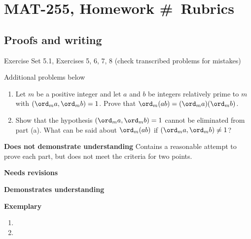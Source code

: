 \documentclass[letterpaper, 11pt]{../ximera}
\begin{document}
\chapter{MAT-255, Homework \#\homework\ Rubrics}

\section*{Proofs and writing}  %
Exercise Set 5.1, Exercises 5, 6, 7, 8 (check transcribed problems for mistakes)

\noindent Additional problems below

\begin{ex} 
	\begin{enumerate}[label=(\alph*)]
 		\item\label{order_mult} Let $m$ be a positive integer and let $a$ and $b$ be integers relatively prime to $m$ with $(\ord_m a, \ord_m b)=1$. Prove that $\ord_m(ab)=(\ord_m a)(\ord_m b)$.
		\item Show that the hypothesis $(\ord_m a, \ord_m b)=1$ cannot be eliminated from part (a). What can be said about $\ord_m(ab)$ if $(\ord_m a, \ord_m b)\neq1$?
	\end{enumerate}
 
\end{ex}	

\begin{writeRubric}
    \item \textbf{Does not demonstrate understanding}
     Contains a reasonable attempt to prove each part, but does not meet the criteria for two points.
    \item \textbf{Needs revisions}
     
    \item \textbf{Demonstrates understanding}
    
    \item \textbf{Exemplary}
        
\end{writeRubric}
                                       	
\begin{solution}
 	\begin{enumerate}[label=(\alph*)]
 		\item
		\item 
	\end{enumerate}

\end{solution}
	
\end{document}
